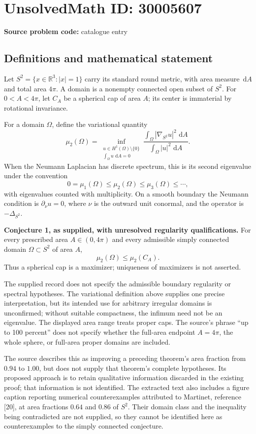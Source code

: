 \documentclass[11pt]{article}
\newcommand{\R}{\mathbb{R}}
\newcommand{\dd}{\,\mathrm{d}}
\begin{document}
\section*{UnsolvedMath ID: 30005607}
\textbf{Source problem code:} catalogue entry
\subsection{Definitions and mathematical statement}
Let \(S^2=\{x\in\R^3:|x|=1\}\) carry its standard round metric, with area measure \(\dd A\) and total area \(4\pi\). A domain is a nonempty connected open subset of \(S^2\). For \(0<A<4\pi\), let \(C_A\) be a spherical cap of area \(A\); its center is immaterial by rotational invariance.

For a domain \(\Omega\), define the variational quantity
\[
\mu_2(\Omega)=\inf_{\substack{u\in H^1(\Omega)\setminus\{0\}\\ \int_\Omega u\,\dd A=0}}
\frac{\int_\Omega |\nabla_{S^2}u|^2\,\dd A}{\int_\Omega |u|^2\,\dd A}.
\]
When the Neumann Laplacian has discrete spectrum, this is its second eigenvalue under the convention
\[
0=\mu_1(\Omega)\leq\mu_2(\Omega)\leq\mu_3(\Omega)\leq\cdots,
\]
with eigenvalues counted with multiplicity. On a smooth boundary the Neumann condition is \(\partial_\nu u=0\), where \(\nu\) is the outward unit conormal, and the operator is \(-\Delta_{S^2}\).

\textbf{Conjecture 1, as supplied, with unresolved regularity qualifications.} For every prescribed area \(A\in(0,4\pi)\) and every admissible simply connected domain \(\Omega\subset S^2\) of area \(A\),
\[
\mu_2(\Omega)\leq\mu_2(C_A).
\]
Thus a spherical cap is a maximizer; uniqueness of maximizers is not asserted.

The supplied record does not specify the admissible boundary regularity or spectral hypotheses. The variational definition above supplies one precise interpretation, but its intended use for arbitrary irregular domains is unconfirmed; without suitable compactness, the infimum need not be an eigenvalue. The displayed area range treats proper caps. The source's phrase ``up to 100 percent'' does not specify whether the full-area endpoint \(A=4\pi\), the whole sphere, or full-area proper domains are included.

The source describes this as improving a preceding theorem's area fraction from \(0.94\) to \(1.00\), but does not supply that theorem's complete hypotheses. Its proposed approach is to retain qualitative information discarded in the existing proof; that information is not identified. The extracted text also includes a figure caption reporting numerical counterexamples attributed to Martinet, reference [20], at area fractions \(0.64\) and \(0.86\) of \(S^2\). Their domain class and the inequality being contradicted are not supplied, so they cannot be identified here as counterexamples to the simply connected conjecture.
\end{document}
